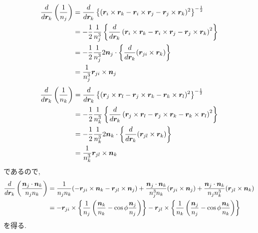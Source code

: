 \begin{align}
    \frac{d}{d \bm{r}_{k}} \left(\frac{1}{n_{j}} \right)
 &=
    \frac{d}{d \bm{r}_{k}}
    \left\{(  \bm{r}_{i} \times \bm{r}_{k}
            - \bm{r}_{i} \times \bm{r}_{j}
            - \bm{r}_{j} \times \bm{r}_{k} )^{2}
    \right\}^{-\frac{1}{2}}
 \notag
 \\
 &=
   -\frac{1}{2} \frac{1}{n_{j}^{3}}
    \left\{
           \frac{d}{d \bm{r}_{k}}
           \left(  \bm{r}_{i} \times \bm{r}_{k}
                 - \bm{r}_{i} \times \bm{r}_{j}
                 - \bm{r}_{j} \times \bm{r}_{k}
            \right)^{2}
    \right\}
 \notag
 \\
 &=
   - \frac{1}{2} \frac{1}{n_{j}^{3}}
    2\bm{n}_{j} \cdot
    \left\{
           \frac{d}{d \bm{r}_{k}} (\bm{r}_{ji} \times \bm{r}_{k})
    \right\}
 \notag
 \\
 &=
    \frac{1}{n_{j}^{3}} \bm{r}_{ji} \times \bm{n}_{j}
\notag
\end{align}
\begin{align}
    \frac{d}{d \bm{r}_{k}} \left(\frac{1}{n_{k}} \right)
 &=
    \frac{d}{d \bm{r}_{k}}
    \left\{(  \bm{r}_{j} \times \bm{r}_{l}
            - \bm{r}_{j} \times \bm{r}_{k}
            - \bm{r}_{k} \times \bm{r}_{l} )^{2}
    \right\}^{-\frac{1}{2}}
 \notag
 \\
 &=
   -\frac{1}{2} \frac{1}{n_{k}^{3}}
    \left\{
           \frac{d}{d \bm{r}_{k}}
           \left(  \bm{r}_{j} \times \bm{r}_{l}
                 - \bm{r}_{j} \times \bm{r}_{k}
                 - \bm{r}_{k} \times \bm{r}_{l}
            \right)^{2}
    \right\}
 \notag
 \\
 &=
   - \frac{1}{2} \frac{1}{n_{k}^{3}}
    2\bm{n}_{k} \cdot
    \left\{
            \frac{d}{d \bm{r}_{k}} (\bm{r}_{jl} \times \bm{r}_{k})
    \right\}
 \notag
 \\
 &=
    \frac{1}{n_{k}^{3}} \bm{r}_{jl} \times \bm{n}_{k}
\notag
\end{align}
であるので, 
\begin{align}
     \frac{d}{d \bm{r}_{k}}
     \left( \frac{\bm{n}_{j} \cdot \bm{n}_{k}} {n_{j} n_{k}} \right)
 &=
     \frac{1}{n_{j}n_{k}}
      (- \bm{r}_{ji} \times \bm{n}_{k} - \bm{r}_{jl} \times \bm{n}_{j})
   + \frac{\bm{n}_{j} \cdot \bm{n}_{k}}{n_{j}^{3}n_{k}}
      (\bm{r}_{ji} \times \bm{n}_{j})
   + \frac{\bm{n}_{j} \cdot \bm{n}_{k}}{n_{j}n_{k}^{3}}
      (\bm{r}_{jl} \times \bm{n}_{k})
 \notag
 \\
 &=
   - \bm{r}_{ji} \times
     \left\{
            \frac{1}{n_{j}}
            \left(
                   \frac{\bm{n}_{k}}{n_{k}} - \cos\phi \frac{\bm{n}_{j}}{n_{j}}
            \right)
     \right\}
   -
     \bm{r}_{jl} \times
     \left\{
            \frac{1}{n_{k}}
            \left(
                   \frac{\bm{n}_{j}}{n_{j}} - \cos\phi \frac{\bm{n}_{k}}{n_{k}}
            \right)
     \right\}
 \notag
\end{align}
を得る.
\\


